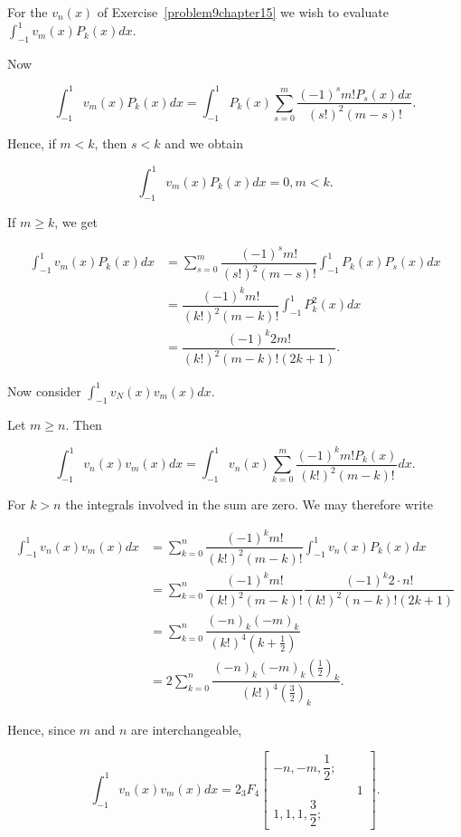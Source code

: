 \begin{solution}
For the $v_n(x)$ of Exercise~\ref{problem9chapter15} we wish to evaluate $\displaystyle\int_{-1}^1 v_m(x) P_k(x)dx.$

Now

$$\displaystyle\int_{-1}^1 v_m(x) P_k(x) dx = \displaystyle\int_{-1}^1 P_k(x) \displaystyle\sum_{s=0}^m \dfrac{(-1)^s m! P_s(x) dx}{(s!)^2 (m-s)!}.$$

Hence, if $m<k$, then $s<k$ and we obtain

$$\displaystyle\int_{-1}^1 v_m(x) P_k(x) dx = 0, m<k.$$

If $m \geq k$, we get

$$\begin{array}{ll}
\displaystyle\int_{-1}^1 v_m(x) P_k(x) dx &= \displaystyle\sum_{s=0}^m \dfrac{(-1)^sm!}{(s!)^2(m-s)!} \displaystyle\int_{-1}^1 P_k(x) P_s(x) dx \\
&= \dfrac{(-1)^k m!}{(k!)^2 (m-k)!} \displaystyle\int_{-1}^1 P_k^2(x) dx \\
&= \dfrac{(-1)^k 2m!}{(k!)^2(m-k)! (2k+1)}.
\end{array}$$

Now consider $\displaystyle\int_{-1}^1 v_N(x) v_m(x) dx.$

Let $m \geq n$. Then

$$\displaystyle\int_{-1}^1 v_n(x) v_m(x) dx = \displaystyle\int_{-1}^1 v_n(x) \displaystyle\sum_{k=0}^m \dfrac{(-1)^k m! P_k(x)}{(k!)^2 (m-k)!} dx.$$

For $k>n$ the integrals involved in the sum are zero. We may therefore write

$$\begin{array}{ll}
\displaystyle\int_{-1}^1 v_n(x) v_m(x) dx &= \displaystyle\sum_{k=0}^n \dfrac{(-1)^k m!}{(k!)^2 (m-k)!} \displaystyle\int_{-1}^1 v_n(x) P_k(x) dx \\
&= \displaystyle\sum_{k=0}^n \dfrac{(-1)^k m!}{(k!)^2 (m-k)!} \dfrac{(-1)^k 2 \cdot n!}{(k!)^2(n-k)! (2k+1)} \\
&= \displaystyle\sum_{k=0}^n \dfrac{(-n)_k(-m)_k}{(k!)^4 (k + \frac{1}{2})} \\
&= 2 \displaystyle\sum_{k=0}^n \dfrac{(-n)_k (-m)_k (\frac{1}{2})_k}{(k!)^4 (\frac{3}{2})_k}.
\end{array}$$

Hence, since $m$ and $n$ are interchangeable,

$$\displaystyle\int_{-1}^1 v_n(x) v_m(x) dx = 2 {}_3F_4 \left[ \begin{array}{rlr}
-n, -m, \dfrac{1}{2}; & & \\
& & 1 \\
1,1,1,\dfrac{3}{2}; & & 
\end{array} \right].$$
\end{solution}
